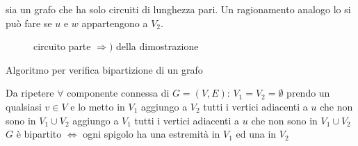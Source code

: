 sia un grafo che ha solo circuiti di lunghezza pari. Un ragionamento analogo lo si può fare se
$u$ e $w$ appartengono a $V_2$.
\begin{figure}[H]
    \centering
    \caption{circuito parte $\Longrightarrow)$ della dimostrazione}
    \label{fig:circuito_dim}
\end{figure}
\endproof


\begin{algorithm}
\caption{Algoritmo per verifica bipartizione di un grafo}\label{alg:algo_bipartizione}
\begin{algorithmic} 
\STATE Da ripetere $\forall$ componente connessa di $G=(V,E)$:
\STATE $V_1 = V_2 = \emptyset$
\STATE prendo un qualsiasi $v \in V$ e lo metto in $V_1$
    \STATE{}
        \STATE aggiungo a $V_2$ tutti i vertici adiacenti a $u$ che non sono in $V_1 \cup V_2$
    \ELSE
        \STATE aggiungo a $V_1$ tutti i vertici adiacenti a $u$ che non sono in $V_1 \cup V_2$
    \ENDIF
\ENDFOR
\STATE $G$ è bipartito $\iff$ ogni spigolo ha una estremità in $V_1$ ed una in $V_2$

\end{algorithmic}
\end{algorithm}

